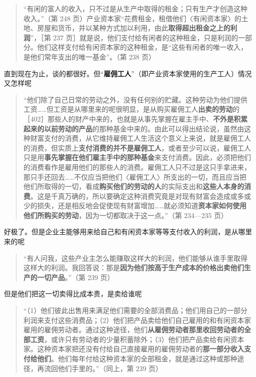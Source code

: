 \begin{quote}“有闲的富人的收入，只不过是从生产中取得的租金；只有生产才创造这种收入。”（第 248 页）产业资本家“花费租金，租借他们〈有闲资本家〉的土地、房屋和货币，并以某种方式加以利用，由此\textbf{取得超出租金之上的利润}”，［第 237 页］就是说，他们支付给有闲者的这种租金，只是利润的一部分。他们这样支付给有闲资本家的这种租金，是“这些有闲者的唯一收入，是他们常年支出的唯一基金”。（第 238 页）\end{quote}

直到现在为止，谈的都很好。但“\textbf{雇佣工人}”（即产业资本家使用的生产工人）情况又怎样呢

\begin{quote}“他们除了自己日常的劳动之外，没有任何别的贮藏。这种劳动为他们提供工资……但工资是从哪里来的呢很明显，是从购买雇佣工人\textbf{出卖的劳动}的［402］那些人的财产中来的，也就是从事先掌握在雇主手中、\textbf{不外是积累起来的以前劳动的产品}的那种基金中来的。由此可以得出结论说，虽然由这种财富支付的消费，从它维持雇佣工人生活这个意义上来说，就是雇佣工人的消费，但实质上\textbf{支付消费的并不是雇佣工人}，或者至少可以说，雇佣工人只是用\textbf{事先掌握在他们雇主手中的那种基金}来支付消费。因此，必须把他们的消费看作是雇用他们的那些人的消费。雇佣工人只不过是这只手拿进来，那只手还回去……不仅应当把他们〈雇佣工人〉所支出的一切，而且应当把他们所取得的一切，看成\textbf{购买他们的劳动的人}的实际支出和\textbf{这些人本身的消费}。这是千真万确的，所以要确定这种消费究竟是对现有财富会造成或多或少的损失，还是相反地会促使现有财富增加……就必须知道\textbf{资本家如何使用他们所购买的劳动}，因为一切都取决于这一点。”（第 234—235 页）\end{quote}

好极了。但是企业主能够用来给自己和有闲资本家等等支付收入的利润，是从哪里来的呢

\begin{quote}“有人问我，这些产业主怎么能赚取这样大的利润，他们能够从谁手里取得这样大的利润。我回答说：那是\textbf{因为他们按高于生产成本的价格出卖他们生产的一切产品}。”（第 239 页）\end{quote}

但是他们把这一切卖得比成本贵，是卖给谁呢

\begin{quote}“（1）他们彼此出售用来满足他们需要的全部消费品；他们用自己的一部分利润来支付这些消费品；（2）他们把产品卖给他们自己雇用的和有闲资本家雇用的雇佣劳动者。通过这种途径，他们\textbf{从雇佣劳动者那里收回劳动者的全部工资}，或许只有劳动者的少量积蓄除外；（3）他们把产品卖给有闲资本家。这种资本家把还没有付给自己直接雇用的雇佣劳动者的\textbf{那一部分收入支付给他们}。他们每年付给这种资本家的全部租金，就是通过这种或那种途径，再流回他们手里的。”（同上，第 239 页）\end{quote}

